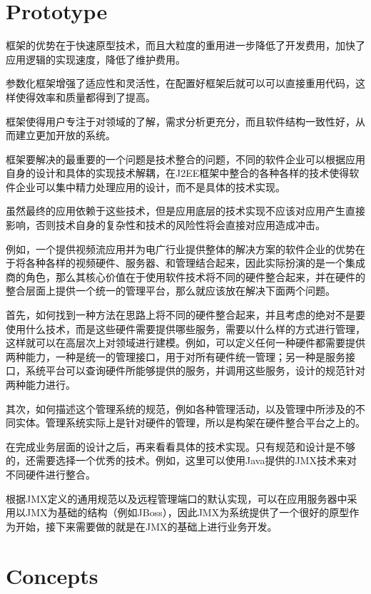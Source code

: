 \section{Prototype}

框架的优势在于快速原型技术，而且大粒度的重用进一步降低了开发费用，加快了应用逻辑的实现速度，降低了维护费用。

参数化框架增强了适应性和灵活性，在配置好框架后就可以可以直接重用代码，这样使得效率和质量都得到了提高。

框架使得用户专注于对领域的了解，需求分析更充分，而且软件结构一致性好，从而建立更加开放的系统。


框架要解决的最重要的一个问题是技术整合的问题，不同的软件企业可以根据应用自身的设计和具体的实现技术解耦，在J2EE框架中整合的各种各样的技术使得软件企业可以集中精力处理应用的设计，而不是具体的技术实现。

虽然最终的应用依赖于这些技术，但是应用底层的技术实现不应该对应用产生直接影响，否则技术自身的复杂性和技术的风险性将会直接对应用造成冲击。

例如，一个提供视频流应用并为电广行业提供整体的解决方案的软件企业的优势在于将各种各样的视频硬件、服务器、和管理结合起来，因此实际扮演的是一个集成商的角色，那么其核心价值在于使用软件技术将不同的硬件整合起来，并在硬件的整合层面上提供一个统一的管理平台，那么就应该放在解决下面两个问题。

首先，如何找到一种方法在思路上将不同的硬件整合起来，并且考虑的绝对不是要使用什么技术，而是这些硬件需要提供哪些服务，需要以什么样的方式进行管理，这样就可以在高层次上对领域进行建模。例如，可以定义任何一种硬件都需要提供两种能力，一种是统一的管理接口，用于对所有硬件统一管理；另一种是服务接口，系统平台可以查询硬件所能够提供的服务，并调用这些服务，设计的规范针对两种能力进行。

其次，如何描述这个管理系统的规范，例如各种管理活动，以及管理中所涉及的不同实体。管理系统实际上是针对硬件的管理，所以是构架在硬件整合平台之上的。

在完成业务层面的设计之后，再来看看具体的技术实现。只有规范和设计是不够的，还需要选择一个优秀的技术。例如，这里可以使用Java提供的JMX技术来对不同硬件进行整合。

根据JMX定义的通用规范以及远程管理端口的默认实现，可以在应用服务器中采用以JMX为基础的结构（例如JBoss），因此JMX为系统提供了一个很好的原型作为开始，接下来需要做的就是在JMX的基础上进行业务开发。

\section{Concepts}


